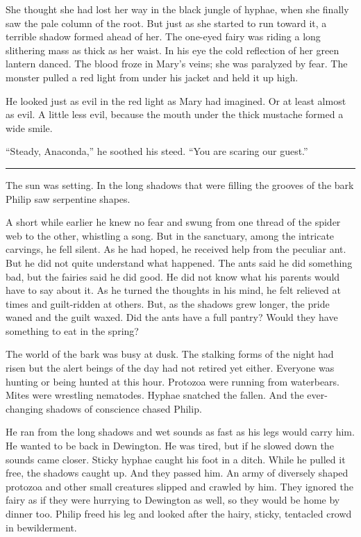 \documentclass[10pt]{memoir}
\renewcommand{\pfbreakdisplay}{\bigskip \ding{166} \bigskip}
\newcommand{\secbreak}{\fancybreak{\pfbreakdisplay}}
\begin{document}
She thought she had lost her way in the black jungle of hyphae, when she
finally saw the pale column of the root. But just as she started to run toward
it, a terrible shadow formed ahead of her. The one-eyed fairy was riding a long
slithering mass as thick as her waist. In his eye the cold reflection of her
green lantern danced. The blood froze in Mary's veins; she was paralyzed by
fear. The monster pulled a red light from under his jacket and held it up high.

He looked just as evil in the red light as Mary had imagined. Or at least
almost as evil. A little less evil, because the mouth under the thick mustache
formed a wide smile.

``Steady, Anaconda,'' he soothed his steed. ``You are scaring our guest.''

\secbreak

The sun was setting. In the long shadows that were filling the grooves
of the bark Philip saw serpentine shapes.

A short while earlier he knew no fear and swung from one thread of the spider
web to the other, whistling a song. But in the sanctuary, among the intricate
carvings, he fell silent. As he had hoped, he received help from the peculiar
ant. But he did not quite understand what happened. The ants said he did
something bad, but the fairies said he did good. He did not know what his
parents would have to say about it. As he turned the thoughts in his mind, he
felt relieved at times and guilt-ridden at others. But, as the shadows grew
longer, the pride waned and the guilt waxed. Did the ants have a full pantry?
Would they have something to eat in the spring?

The world of the bark was busy at dusk. The stalking forms of the night had
risen but the alert beings of the day had not retired yet either. Everyone was
hunting or being hunted at this hour. Protozoa were running from waterbears.
Mites were wrestling nematodes. Hyphae snatched the fallen. And the
ever-changing shadows of conscience chased Philip.

He ran from the long shadows and wet sounds as fast as his legs would carry
him. He wanted to be back in Dewington. He was tired, but if he slowed down the
sounds came closer. Sticky hyphae caught his foot in a ditch. While he pulled
it free, the shadows caught up. And they passed him. An army of diversely
shaped protozoa and other small creatures slipped and crawled by him. They
ignored the fairy as if they were hurrying to Dewington as well, so they would
be home by dinner too. Philip freed his leg and looked after the hairy, sticky,
tentacled crowd in bewilderment.
\end{document}
